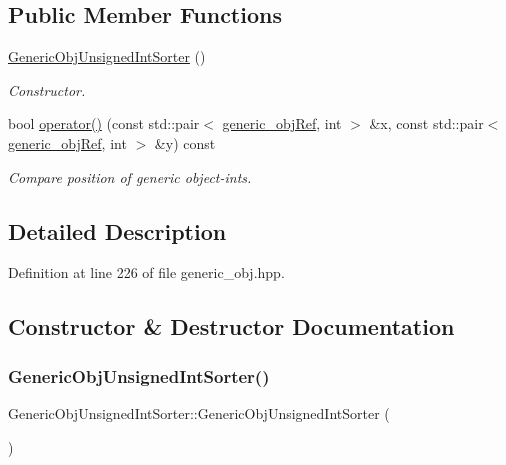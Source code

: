 \subsection*{Public Member Functions}
\begin{DoxyCompactItemize}
\item 
\hyperlink{classGenericObjUnsignedIntSorter_a687f9d0730b79238b158ed00c6301ec9}{Generic\+Obj\+Unsigned\+Int\+Sorter} ()
\begin{DoxyCompactList}\small\item\em Constructor. \end{DoxyCompactList}\item 
bool \hyperlink{classGenericObjUnsignedIntSorter_ad711ca8ecd00c381d2af88dd02efffbf}{operator()} (const std\+::pair$<$ \hyperlink{generic__obj_8hpp_acb533b2ef8e0fe72e09a04d20904ca81}{generic\+\_\+obj\+Ref}, int $>$ \&x, const std\+::pair$<$ \hyperlink{generic__obj_8hpp_acb533b2ef8e0fe72e09a04d20904ca81}{generic\+\_\+obj\+Ref}, int $>$ \&y) const
\begin{DoxyCompactList}\small\item\em Compare position of generic object-\/ints. \end{DoxyCompactList}\end{DoxyCompactItemize}


\subsection{Detailed Description}


Definition at line 226 of file generic\+\_\+obj.\+hpp.



\subsection{Constructor \& Destructor Documentation}
\mbox{\label{classGenericObjUnsignedIntSorter_a687f9d0730b79238b158ed00c6301ec9}} 
\subsubsection{\texorpdfstring{Generic\+Obj\+Unsigned\+Int\+Sorter()}{GenericObjUnsignedIntSorter()}}
{\footnotesize\ttfamily Generic\+Obj\+Unsigned\+Int\+Sorter\+::\+Generic\+Obj\+Unsigned\+Int\+Sorter (\begin{DoxyParamCaption}{ }\end{DoxyParamCaption})\hspace{0.3cm}{\ttfamily [default]}}



